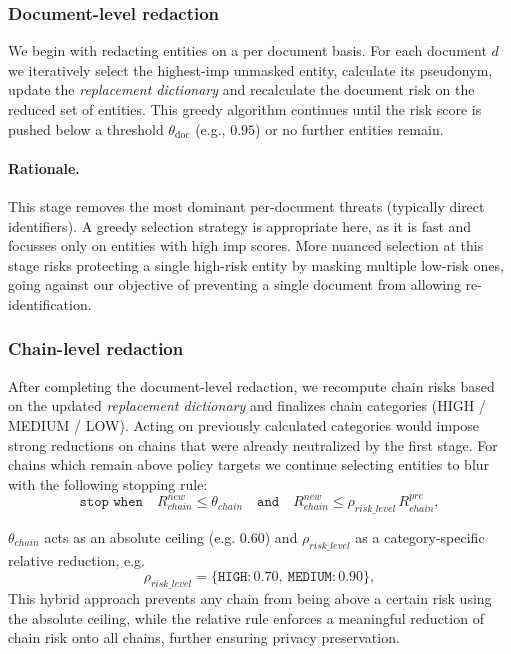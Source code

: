 \subsubsection{Document-level redaction}
We begin with redacting entities on a per document basis. For each document $d$ we iteratively select the highest-$\mathrm{imp}$ unmasked entity, calculate its pseudonym, update the \textit{replacement dictionary} and recalculate the document risk on the reduced set of entities. This greedy algorithm continues until the risk score is pushed below a threshold $\theta_{\mathrm{doc}}$ (e.g., $0.95$) or no further entities remain.
\paragraph{Rationale.} This stage removes the most dominant per-document threats (typically direct identifiers). A greedy selection strategy is appropriate here, as it is fast and focusses only on entities with high $\mathrm{imp}$ scores. More nuanced selection at this stage risks protecting a single high-risk entity by masking multiple low-risk ones, going against our objective of preventing a single document from allowing re-identification.


\subsubsection{Chain-level redaction}
After completing the document-level redaction, we recompute chain risks based on the updated \textit{replacement dictionary} and finalizes chain categories (HIGH / MEDIUM / LOW). Acting on previously calculated categories would impose strong reductions on chains that were already neutralized by the first stage. For chains which remain above policy targets we continue selecting entities to blur with the following stopping rule: 
\[
\texttt{stop when}\quad R_{chain}^{new} \le \theta_{chain} \quad \texttt{and} \quad R_{chain}^{new} \le \rho_{risk\_level}\,R_{chain}^{pre},
\]

$\theta_{chain}$ acts as an absolute ceiling (e.g. $0.60$) and $\rho_{risk\_level}$ as a category-specific relative reduction, e.g.
\[
\rho_{risk\_level} = \{\texttt{HIGH}:0.70,\ \texttt{MEDIUM}:0.90\},
\]
This hybrid approach prevents any chain from being above a certain risk using the absolute ceiling, while the relative rule enforces a meaningful reduction of chain risk onto all chains, further ensuring privacy preservation.


